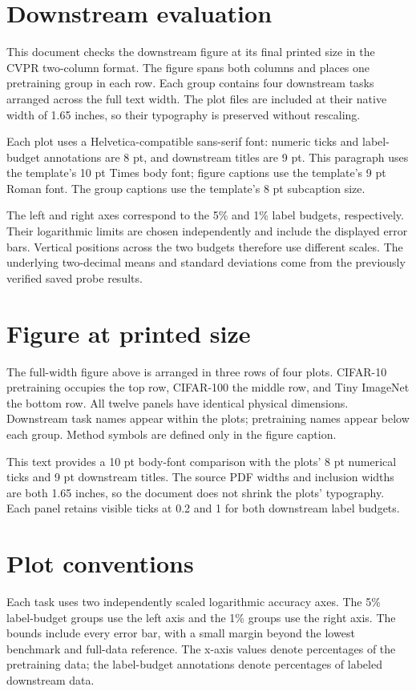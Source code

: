 \documentclass[10pt,twocolumn,letterpaper]{article}
\begin{document}

\section{Downstream evaluation}
This document checks the downstream figure at its final printed size in the CVPR two-column format. The figure spans both columns and places one pretraining group in each row. Each group contains four downstream tasks arranged across the full text width. The plot files are included at their native width of 1.65 inches, so their typography is preserved without rescaling.

Each plot uses a Helvetica-compatible sans-serif font: numeric ticks and label-budget annotations are 8 pt, and downstream titles are 9 pt. This paragraph uses the template's 10 pt Times body font; figure captions use the template's 9 pt Roman font. The group captions use the template's 8 pt subcaption size.

The left and right axes correspond to the 5\% and 1\% label budgets, respectively. Their logarithmic limits are chosen independently and include the displayed error bars. Vertical positions across the two budgets therefore use different scales. The underlying two-decimal means and standard deviations come from the previously verified saved probe results.
\newpage
\null
\newpage
\section{Figure at printed size}
The full-width figure above is arranged in three rows of four plots. CIFAR-10 pretraining occupies the top row, CIFAR-100 the middle row, and Tiny ImageNet the bottom row. All twelve panels have identical physical dimensions. Downstream task names appear within the plots; pretraining names appear below each group. Method symbols are defined only in the figure caption.

This text provides a 10 pt body-font comparison with the plots' 8 pt numerical ticks and 9 pt downstream titles. The source PDF widths and inclusion widths are both 1.65 inches, so the document does not shrink the plots' typography. Each panel retains visible ticks at 0.2 and 1 for both downstream label budgets.
\newpage
\section{Plot conventions}
Each task uses two independently scaled logarithmic accuracy axes. The 5\% label-budget groups use the left axis and the 1\% groups use the right axis. The bounds include every error bar, with a small margin beyond the lowest benchmark and full-data reference. The x-axis values denote percentages of the pretraining data; the label-budget annotations denote percentages of labeled downstream data.
\clearpage
\end{document}
